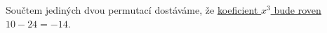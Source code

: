 \documentclass[12pt]{article}
\begin{document}
\begin{enumerate}
\begin{itemize}
        Součtem jediných dvou permutací dostáváme, že \underline{\underline{koeficient $x^3$ bude roven $10-24=-14$}}.

    \end{itemize}










































\end{enumerate}
\end{document}
